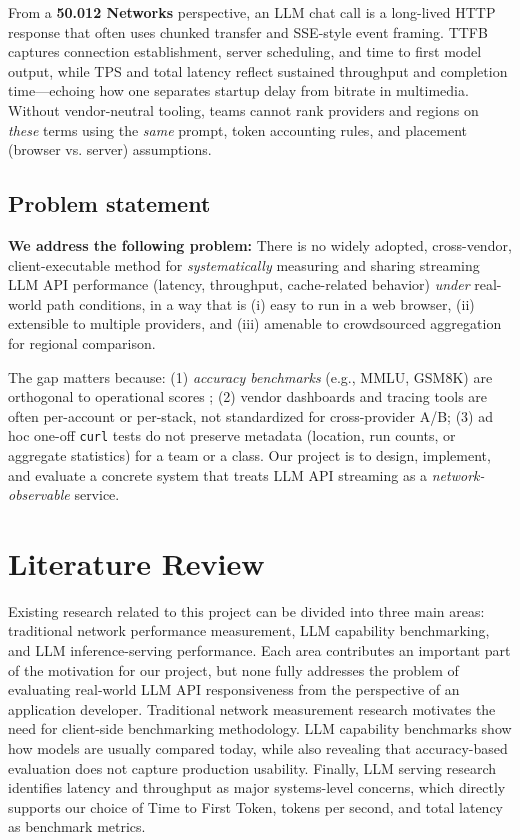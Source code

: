 \documentclass[11pt, a4paper]{article}
\begin{document}
From a \textbf{50.012 Networks} perspective, an LLM chat call is a long-lived HTTP response that often uses chunked transfer and SSE-style event framing. TTFB captures connection establishment, server scheduling, and time to first model output, while TPS and total latency reflect sustained throughput and completion time---echoing how one separates startup delay from bitrate in multimedia. Without vendor-neutral tooling, teams cannot rank providers and regions on \emph{these} terms using the \emph{same} prompt, token accounting rules, and placement (browser vs. server) assumptions.

\subsection{Problem statement}
\textbf{We address the following problem:} There is no widely adopted, cross-vendor, client-executable method for \emph{systematically} measuring and sharing streaming LLM API performance (latency, throughput, cache-related behavior) \emph{under} real-world path conditions, in a way that is (i) easy to run in a web browser, (ii) extensible to multiple providers, and (iii) amenable to crowdsourced aggregation for regional comparison.

The gap matters because: (1) \emph{accuracy benchmarks} (e.g., MMLU, GSM8K) are orthogonal to operational scores \cite{openai_mmlu,gsm8k}; (2) vendor dashboards and tracing tools are often per-account or per-stack, not standardized for cross-provider A/B; (3) ad hoc one-off \texttt{curl} tests do not preserve metadata (location, run counts, or aggregate statistics) for a team or a class. Our project is to design, implement, and evaluate a concrete system that treats LLM API streaming as a \emph{network-observable} service.

\section{Literature Review}

Existing research related to this project can be divided into three main areas: traditional network performance measurement, LLM capability benchmarking, and LLM inference-serving performance. Each area contributes an important part of the motivation for our project, but none fully addresses the problem of evaluating real-world LLM API responsiveness from the perspective of an application developer. Traditional network measurement research motivates the need for client-side benchmarking methodology. LLM capability benchmarks show how models are usually compared today, while also revealing that accuracy-based evaluation does not capture production usability. Finally, LLM serving research identifies latency and throughput as major systems-level concerns, which directly supports our choice of Time to First Token, tokens per second, and total latency as benchmark metrics.
\end{document}
